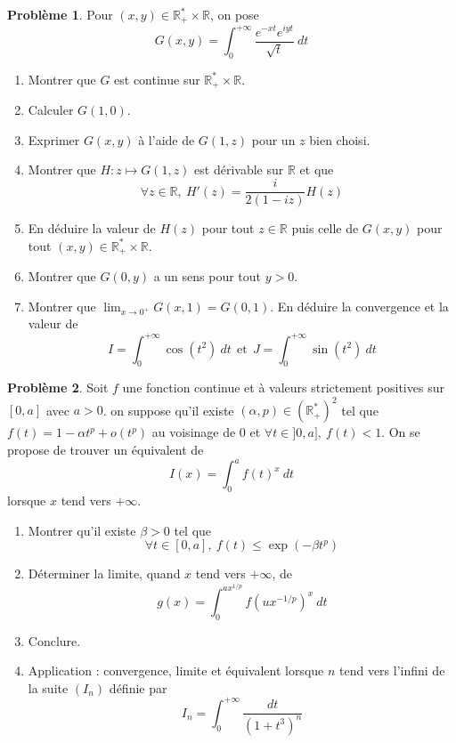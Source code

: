 \documentclass[french]{book}
\newcommand{\R}{\mathbb{R}}
\newcommand{\st}{^*}
\theoremstyle{definition}
\newtheorem{pro}{Problème}[chapter]
\theoremstyle{remark}
\begin{document}
\begin{pro}
	Pour $(x,y)\in\R_+\st\times\R$, on pose $$G(x,y)=\int_{0}^{+\infty}\frac{e^{-xt}e^{iyt}}{\sqrt{t}}\ dt$$
	\begin{enumerate}
		\item Montrer que $G$ est continue sur $\R_+\st\times\R$.
		\item Calculer $G(1,0)$.
		\item Exprimer $G(x,y)$ à l'aide de $G(1,z)$ pour un $z$ bien choisi.
		\item Montrer que $H:z\mapsto G(1,z)$ est dérivable sur $\R$ et que $$\forall z\in\R,\ H'(z)=\frac{i}{2(1-iz)}H(z)$$
		\item En déduire la valeur de $H(z)$ pour tout $z\in\R$ puis celle de $G(x,y)$ pour tout $(x,y)\in\R_+\st\times\R$.
		\item Montrer que $G(0,y)$ a un sens pour tout $y>0$.
		\item Montrer que $\displaystyle\lim_{x\to 0^+}G(x,1)=G(0,1)$. En déduire la convergence et la valeur de $$I=\int_{0}^{+\infty}\cos(t^2)\ dt \ \ \text{et} \ \ J=\int_{0}^{+\infty}\sin(t^2)\ dt$$
	\end{enumerate}
\end{pro}

\begin{pro}
	Soit $f$ une fonction continue et à valeurs strictement positives sur $[0,a]$ avec $a>0$. on suppose qu'il existe $(\alpha,p)\in(\R_+\st)^2$ tel que $f(t)=1-\alpha t^p+o(t^p)$ au voisinage de $0$ et $\forall t\in]0,a],\ f(t)<1$. On se propose de trouver un équivalent de $$I(x)=\int_{0}^{a}f(t)^x\ dt$$ lorsque $x$ tend vers $+\infty$.
	\begin{enumerate}
		\item Montrer qu'il existe $\beta>0$ tel que $$\forall t\in[0,a],\ f(t)\leqslant\exp(-\beta t^p)$$
		\item Déterminer la limite, quand $x$ tend vers $+\infty$, de $$g(x)=\int_{0}^{ax^{1/p}}f\left(ux^{-1/p}\right)^x\ dt$$
		\item Conclure.
		\item Application : convergence, limite et équivalent lorsque $n$ tend vers l'infini de la suite $(I_n)$ définie par $$I_n=\int_{0}^{+\infty}\frac{dt}{(1+t^3)^n}$$
	\end{enumerate}
\end{pro}
\end{document}
